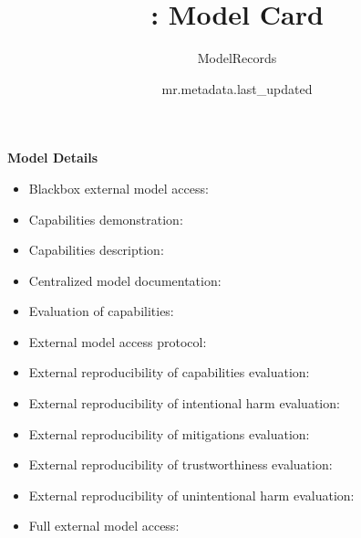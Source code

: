\documentclass{article}
\title{\VAR{mr.metadata.name}: Model Card}
\author{ModelRecords}
\date{mr.metadata.last_updated}
\begin{document}
\newenvironment{mcsection}[1]
    {
        \textbf{#1}


        \begin{itemize}[leftmargin=*,topsep=0pt,itemsep=-1ex,partopsep=1ex,parsep=1ex,after=\vspace{\medskipamount}]
    }
    {
        \end{itemize}
    }

\begin{adjustwidth}{-60pt}{-30pt}
\begin{singlespace}

\begin{tcolorbox}[title=\textbf{\VAR{mr.metadata.name} : Model Card},
    breakable, sharp corners, boxrule=0.7pt]

\begin{mcsection}{Model Details}
    \item Blackbox external model access: 
    \item Capabilities demonstration: 
    \item Capabilities description: 
    \item Centralized model documentation: 
    \item Evaluation of capabilities: 
    \item External model access protocol: 
    \item External reproducibility of capabilities evaluation: 
    \item External reproducibility of intentional harm evaluation: 
    \item External reproducibility of mitigations evaluation: 
    \item External reproducibility of trustworthiness evaluation: 
    \item External reproducibility of unintentional harm evaluation: 
    \item Full external model access: 

\end{mcsection}
\end{tcolorbox}
\end{singlespace}
\end{adjustwidth}
\end{document}
